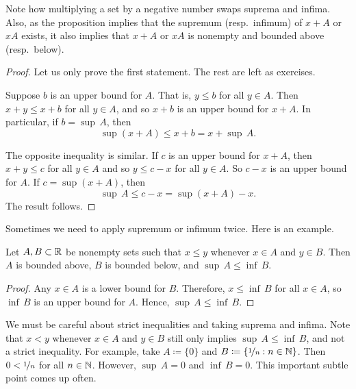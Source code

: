 Note how multiplying a set by a negative number swaps suprema and infima.
Also, as the proposition implies that
the supremum (resp.\ infimum) of $x+A$ or $xA$ exists,
it also implies that $x+A$ or $xA$
is nonempty and bounded above (resp.\ below).

\begin{proof}
Let us only prove the first statement.  The rest are left as exercises.

Suppose $b$ is an upper bound for $A$.  That is, $y \leq b$ for all $y \in A$.
Then $x+y \leq x+b$ for all $y \in A$, and so $x+b$ is an upper
bound for $x+A$.  In particular, if $b = \sup\, A$, then
\begin{equation*}
\sup (x+A) \leq x+b = x+ \sup\, A .
\end{equation*}

The opposite inequality is similar. If $c$ is an upper bound for $x+A$,
then $x+y \leq c$
for all $y \in A$ and so $y \leq c-x$ for all $y \in A$.
So $c-x$ is an upper bound for $A$.
If $c = \sup (x+A)$, then
\begin{equation*}
\sup\, A \leq c-x = \sup (x+A) -x .
\end{equation*}
The result follows.
\end{proof}

Sometimes we need to apply supremum or infimum twice.  Here is an example.

\begin{prop} \label{infsupineq:prop}
Let $A, B \subset {\mathbb{R}}$ be nonempty sets such that $x \leq y$ whenever $x \in A$ and
$y \in B$.  Then $A$ is bounded above, $B$ is bounded below, and $\sup\, A \leq \inf\, B$.
\end{prop}

\begin{proof}
Any $x \in A$ is a lower bound for $B$.
Therefore, $x \leq \inf\, B$ for all $x \in A$,
so $\inf\, B$ is an upper bound for $A$.
Hence, $\sup\, A \leq \inf\, B$.
\end{proof}

We must be careful about strict inequalities and taking suprema and infima.
Note that $x < y$ whenever $x \in A$ and
$y \in B$ still only implies $\sup\, A \leq \inf\, B$, and not a strict
inequality.
For example, take $A \coloneqq \{ 0 \}$ and $B \coloneqq \{ \nicefrac{1}{n}
: n \in {\mathbb{N}} \}$.
Then $0 < \nicefrac{1}{n}$
for all $n \in {\mathbb{N}}$.  However, $\sup\, A = 0$ and $\inf\, B = 0$.
This important subtle point comes up often.

\medskip
\pagebreak[1]

